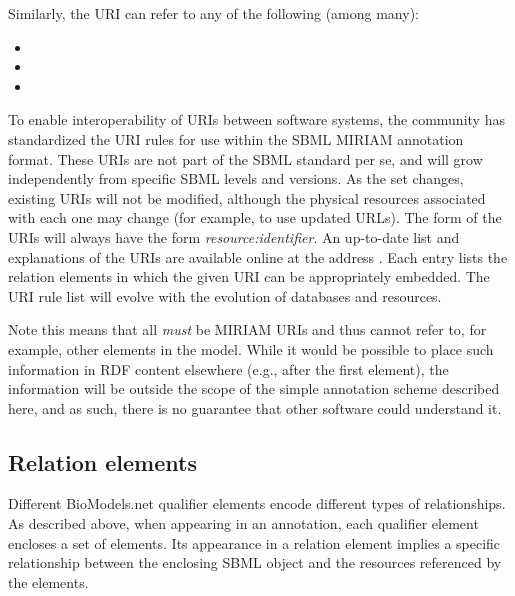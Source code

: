 Similarly, the URI  can refer to
any of the following (among many):
\begin{itemize}\setlength{\parskip}{-0.7ex}

\item {}
\item {}
\item {}

\end{itemize}\vspace*{-1ex}

To enable interoperability of URIs between software systems, the
community has standardized the URI rules for use within the SBML
MIRIAM annotation format.  These URIs are not part of the SBML
standard per se, and will grow independently from specific SBML
levels and versions.  As the set changes, existing URIs will not
be modified, although the physical resources associated with each
one may change (for example, to use updated URLs).  The form of
the URIs will always have the form \emph{resource:identifier}.  An
up-to-date list and explanations of the URIs are available online
at the address .  Each
entry lists the relation elements in which the given URI can be
appropriately embedded.  The URI rule list will evolve with the
evolution of databases and resources.

Note this means that all  \emph{must} be
MIRIAM URIs and thus cannot refer to, for example, other elements
in the model.  While it would be possible to place such
information in RDF content elsewhere (e.g., after the first
 element), the information will be outside
the scope of the simple annotation scheme described here, and as
such, there is no guarantee that other software could understand
it.


\subsection{Relation elements}
\label{sec:qualified-dc-annotation}

Different BioModels.net qualifier elements encode different types
of relationships.  As described above, when appearing in an
annotation, each qualifier element encloses a set of
 elements.  Its appearance in a relation element
implies a specific relationship between the enclosing SBML object
and the resources referenced by the  elements.

